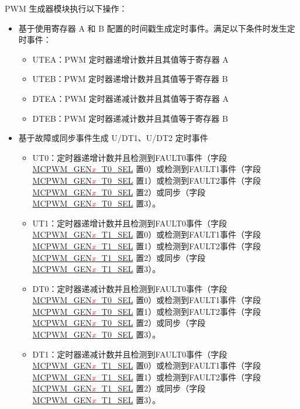 \documentclass[main\_\_CN.tex]{subfiles}
\begin{document}
PWM 生成器模块执行以下操作：
\begin{itemize}
    \item 基于使用寄存器 A 和 B 配置的时间戳生成定时事件。满足以下条件时发生定时事件：
    \begin{itemize}
        \item UTEA：PWM 定时器递增计数并且其值等于寄存器 A
        \item UTEB：PWM 定时器递增计数并且其值等于寄存器 B
        \item DTEA：PWM 定时器递减计数并且其值等于寄存器 A
        \item DTEB：PWM 定时器递减计数并且其值等于寄存器 B
    \end{itemize}
    \item 基于故障或同步事件生成 U/DT1、U/DT2 定时事件
    \begin{itemize}
        \item UT0：定时器递增计数并且检测到FAULT0事件（字段 \hyperref[fielddesc:MCPWMGEN0T0SEL]{MCPWM\_GEN\textcolor{red}{\it{x}}\_T0\_SEL} 置0）或检测到FAULT1事件（字段 \hyperref[fielddesc:MCPWMGEN0T0SEL]{MCPWM\_GEN\textcolor{red}{\it{x}}\_T0\_SEL} 置1）或检测到FAULT2事件（字段 \hyperref[fielddesc:MCPWMGEN0T0SEL]{MCPWM\_GEN\textcolor{red}{\it{x}}\_T0\_SEL} 置2）或同步（字段 \hyperref[fielddesc:MCPWMGEN0T0SEL]{MCPWM\_GEN\textcolor{red}{\it{x}}\_T0\_SEL} 置3）。
        \item UT1：定时器递增计数并且检测到FAULT0事件（字段 \hyperref[fielddesc:MCPWMGEN0T0SEL]{MCPWM\_GEN\textcolor{red}{\it{x}}\_T1\_SEL} 置0）或检测到FAULT1事件（字段 \hyperref[fielddesc:MCPWMGEN0T0SEL]{MCPWM\_GEN\textcolor{red}{\it{x}}\_T1\_SEL} 置1）或检测到FAULT2事件（字段 \hyperref[fielddesc:MCPWMGEN0T0SEL]{MCPWM\_GEN\textcolor{red}{\it{x}}\_T1\_SEL} 置2）或同步（字段 \hyperref[fielddesc:MCPWMGEN0T0SEL]{MCPWM\_GEN\textcolor{red}{\it{x}}\_T1\_SEL} 置3）。
        \item DT0：定时器递减计数并且检测到FAULT0事件（字段 \hyperref[fielddesc:MCPWMGEN0T0SEL]{MCPWM\_GEN\textcolor{red}{\it{x}}\_T0\_SEL} 置0）或检测到FAULT1事件（字段 \hyperref[fielddesc:MCPWMGEN0T0SEL]{MCPWM\_GEN\textcolor{red}{\it{x}}\_T0\_SEL} 置1）或检测到FAULT2事件（字段 \hyperref[fielddesc:MCPWMGEN0T0SEL]{MCPWM\_GEN\textcolor{red}{\it{x}}\_T0\_SEL} 置2）或同步（字段 \hyperref[fielddesc:MCPWMGEN0T0SEL]{MCPWM\_GEN\textcolor{red}{\it{x}}\_T0\_SEL} 置3）。
        \item DT1：定时器递减计数并且检测到FAULT0事件（字段 \hyperref[fielddesc:MCPWMGEN0T0SEL]{MCPWM\_GEN\textcolor{red}{\it{x}}\_T1\_SEL} 置0）或检测到FAULT1事件（字段 \hyperref[fielddesc:MCPWMGEN0T0SEL]{MCPWM\_GEN\textcolor{red}{\it{x}}\_T1\_SEL} 置1）或检测到FAULT2事件（字段 \hyperref[fielddesc:MCPWMGEN0T0SEL]{MCPWM\_GEN\textcolor{red}{\it{x}}\_T1\_SEL} 置2）或同步（字段 \hyperref[fielddesc:MCPWMGEN0T0SEL]{MCPWM\_GEN\textcolor{red}{\it{x}}\_T1\_SEL} 置3）。

\end{itemize}
\end{itemize}
\end{document}
